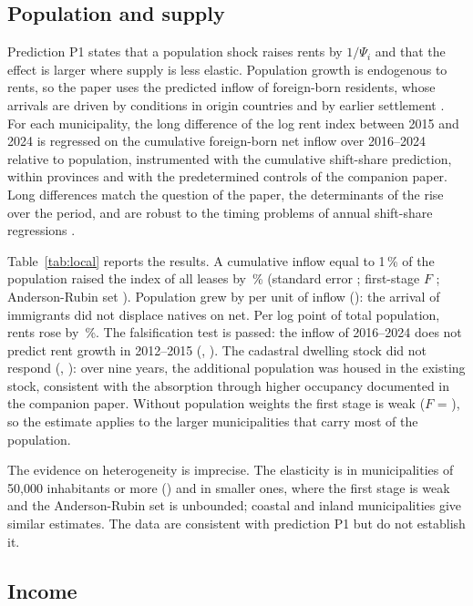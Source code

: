 \documentclass[11pt,a4paper]{article}
\begin{document}
\subsection{Population and supply}

Prediction P1 states that a population shock raises rents by $1/\Psi_i$ and that the effect is larger where supply is less elastic. Population growth is endogenous to rents, so the paper uses the predicted inflow of foreign-born residents, whose arrivals are driven by conditions in origin countries and by earlier settlement \citep{saiz2007,goldsmith2020,borusyak2022}. For each municipality, the long difference of the log rent index between 2015 and 2024 is regressed on the cumulative foreign-born net inflow over 2016--2024 relative to population, instrumented with the cumulative shift-share prediction, within provinces and with the predetermined controls of the companion paper. Long differences match the question of the paper, the determinants of the rise over the period, and are robust to the timing problems of annual shift-share regressions \citep{goldsmith2020}.

Table~\ref{tab:local} reports the results. A cumulative inflow equal to 1\,\% of the population raised the index of all leases by \bPop\,\% (standard error \bPopSe; first-stage $F$ \bPopF; Anderson-Rubin set \bPopAR). Population grew by \bPopP{} per unit of inflow (\bPopPAR): the arrival of immigrants did not displace natives on net. Per log point of total population, rents rose by \bRentP\,\%. The falsification test is passed: the inflow of 2016--2024 does not predict rent growth in 2012--2015 (\bPre, \bPreAR). The cadastral dwelling stock did not respond (\bViv, \bVivAR): over nine years, the additional population was housed in the existing stock, consistent with the absorption through higher occupancy documented in the companion paper. Without population weights the first stage is weak ($F$ = \bPopUnwF), so the estimate applies to the larger municipalities that carry most of the population.

The evidence on heterogeneity is imprecise. The elasticity is \bBig{} in municipalities of 50,000 inhabitants or more (\bBigAR) and \bSmall{} in smaller ones, where the first stage is weak and the Anderson-Rubin set is unbounded; coastal and inland municipalities give similar estimates. The data are consistent with prediction P1 but do not establish it.



\subsection{Income}
\end{document}
